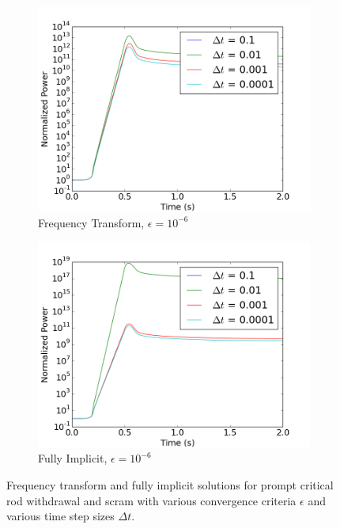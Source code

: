 \documentclass[12pt]{report}
\begin{document}
\begin{figure}[ht]
			\begin{subfigure}{.5\textwidth}
				\centering
				\includegraphics[width=.95\linewidth]{figs/power_case2_conv2.png}
				\caption{Frequency Transform, $\epsilon = 10^{-6}$}
				\label{fig::power_2_3_ft}
			\end{subfigure}%
			\begin{subfigure}{.5\textwidth}
				\centering
				\includegraphics[width=.95\linewidth]{figs/power_case2_conv2_omega0.png}
				\caption{Fully Implicit, $\epsilon = 10^{-6}$}
				\label{fig::power_2_3_fi}
			\end{subfigure}
			\caption{Frequency transform and fully implicit solutions for prompt critical rod withdrawal and scram with various convergence criteria $\epsilon$ and various time step sizes $\Delta t$.}
			\label{fig::power_2}
		\end{figure}
\end{document}
